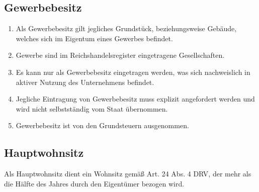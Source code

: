 \documentclass{article}
\begin{document}
\subsection{Gewerbebesitz}
\begin{enumerate}[(1)]
    \item Als Gewerbebesitz gilt jegliches Grundstück, beziehungsweise Gebäude, welches sich im Eigentum eines Gewerbes befindet.
    \item Gewerbe sind im Reichshandelsregister eingetragene Gesellschaften.
    \item Es kann nur als Gewerbebesitz eingetragen werden, was sich nachweislich in aktiver Nutzung des Unternehmens befindet.
    \item Jegliche Eintragung von Gewerbebesitz muss explizit angefordert werden und wird nicht selbstständig vom Staat übernommen.
    \item Gewerbebesitz ist von den Grundsteuern ausgenommen.
\end{enumerate}
\subsection{Hauptwohnsitz}
Als Hauptwohnsitz dient ein Wohnsitz gemäß Art. 24 Abs. 4 DRV, der mehr als die Hälfte des Jahres durch den Eigentümer bezogen wird.
\end{document}
